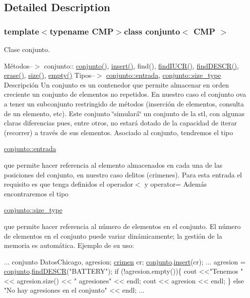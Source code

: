 \subsection{Detailed Description}
\subsubsection*{template$<$typename C\+M\+P$>$class conjunto$<$ C\+M\+P $>$}

Clase conjunto. 

Métodos--$>$ conjunto\+:\+: \hyperlink{classconjunto_ab634a250097d154d69a13bf8bde9fec7}{conjunto()}, \hyperlink{classconjunto_a61c22092268cc91439b93a2fd96e4173}{insert()}, find(), \hyperlink{classconjunto_a076dc70516af91c07b570bca24c6d9f7}{find\+I\+U\+C\+R()}, \hyperlink{classconjunto_ab4f2fdce330e5b53c3ac8f529ccd435d}{find\+D\+E\+S\+C\+R()}, \hyperlink{classconjunto_a92332298c1202e92027b48f01c69ae91}{erase()}, \hyperlink{classconjunto_af9962de5f6425f2030dc0e63015f85b3}{size()}, \hyperlink{classconjunto_a904716d6ae739f0461880b08138cf4e4}{empty()} Tipos--$>$ \hyperlink{classconjunto_a7630ace7cb17bcec07daf5804f1a0780}{conjunto\+::entrada}, \hyperlink{classconjunto_a0cc9902da62790ec2a6d59f4559c2df5}{conjunto\+::size\+\_\+type} Descripción Un conjunto es un contenedor que permite almacenar en orden creciente un conjunto de elementos no repetidos. En nuestro caso el conjunto ova a tener un subconjunto restringido de métodos (inserción de elementos, consulta de un elemento, etc). Este conjunto \char`\"{}simulará\char`\"{} un conjunto de la stl, con algunas claras diferencias pues, entre otros, no estará dotado de la capacidad de iterar (recorrer) a través de sus elementos. Asociado al conjunto, tendremos el tipo
\begin{DoxyCode}
\hyperlink{classcrimen}{conjunto::entrada} 
\end{DoxyCode}
 que permite hacer referencia al elemento almacenados en cada una de las posiciones del conjunto, en nuestro caso delitos (crimenes). Para esta entrada el requisito es que tenga definidos el operador$<$ y operator= Además encontraremos el tipo
\begin{DoxyCode}
\hyperlink{classconjunto_a0cc9902da62790ec2a6d59f4559c2df5}{conjunto::size\_type} 
\end{DoxyCode}
 que permite hacer referencia al número de elementos en el conjunto. El número de elementos en el conjunto puede variar dinámicamente; la gestión de la memoria es automática. Ejemplo de su uso\+: 
\begin{DoxyCode}
...
conjunto DatosChicago, agresion;
\hyperlink{classcrimen}{crimen} cr;
\hyperlink{classconjunto}{conjunto}.\hyperlink{classconjunto_a61c22092268cc91439b93a2fd96e4173}{insert}(cr);
...
agresion = \hyperlink{classconjunto}{conjunto}.\hyperlink{classconjunto_ab4f2fdce330e5b53c3ac8f529ccd435d}{findDESCR}(\textcolor{stringliteral}{"BATTERY"});
\textcolor{keywordflow}{if} (!agresion.empty())\{
 cout <<\textcolor{stringliteral}{"Tenemos "}<< agresion.size() << \textcolor{stringliteral}{" agresiones"} << endl;
 cout << agresion << endl;
\} \textcolor{keywordflow}{else} \textcolor{stringliteral}{"No hay agresiones en el conjunto"} << endl;
...
\end{DoxyCode}
